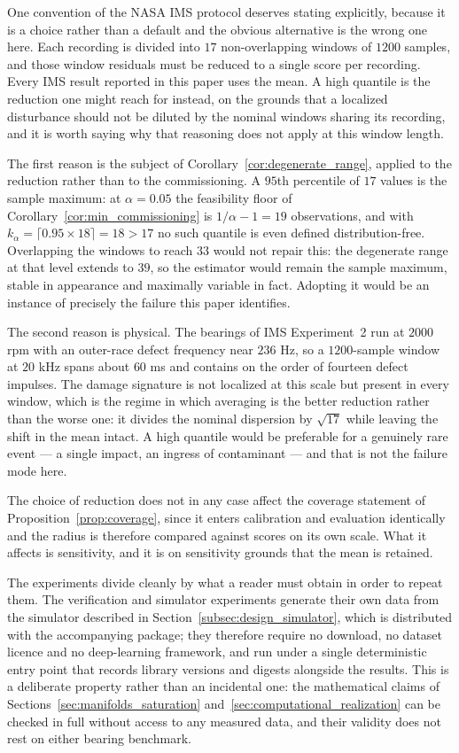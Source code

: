 \documentclass[a4paper]{cas-sc}
\begin{document}
One convention of the NASA IMS protocol deserves stating explicitly, because
it is a choice rather than a default and the obvious alternative is the wrong
one here. Each recording is divided into \(17\) non-overlapping windows of
\(1200\) samples, and those window residuals must be reduced to a single score
per recording. Every IMS result reported in this paper uses the mean. A high
quantile is the reduction one might reach for instead, on the grounds that a
localized disturbance should not be diluted by the nominal windows sharing its
recording, and it is worth saying why that reasoning does not apply at this
window length.

The first reason is the subject of
Corollary~\ref{cor:degenerate_range}, applied to the reduction rather than to
the commissioning. A \(95\)th percentile of \(17\) values is the sample
maximum: at \(\alpha=0.05\) the feasibility floor of
Corollary~\ref{cor:min_commissioning} is \(1/\alpha-1=19\) observations, and
with \(k_\alpha=\lceil 0.95\times 18\rceil = 18 > 17\) no such quantile is
even defined distribution-free. Overlapping the windows to reach \(33\) would
not repair this: the degenerate range at that level extends to \(39\), so the
estimator would remain the sample maximum, stable in appearance and maximally
variable in fact. Adopting it would be an instance of precisely the failure
this paper identifies.

The second reason is physical. The bearings of IMS Experiment~2 run at
\(2000\) rpm with an outer-race defect frequency near \(236\) Hz, so a
\(1200\)-sample window at \(20\) kHz spans about \(60\) ms and contains on the
order of fourteen defect impulses. The damage signature is not localized at
this scale but present in every window, which is the regime in which averaging
is the better reduction rather than the worse one: it divides the nominal
dispersion by \(\sqrt{17}\) while leaving the shift in the mean intact. A high
quantile would be preferable for a genuinely rare event --- a single impact, an
ingress of contaminant --- and that is not the failure mode here.

The choice of reduction does not in any case affect the coverage statement of
Proposition~\ref{prop:coverage}, since it enters calibration and evaluation
identically and the radius is therefore compared against scores on its own
scale. What it affects is sensitivity, and it is on sensitivity grounds that
the mean is retained.

The experiments divide cleanly by what a reader must obtain in order to repeat
them. The verification and simulator experiments generate their own data from
the simulator described in
Section~\ref{subsec:design_simulator}, which is distributed with the
accompanying package; they therefore require no download, no dataset licence
and no deep-learning framework, and run under a single deterministic entry
point that records library versions and digests alongside the results. This is
a deliberate property rather than an incidental one: the mathematical claims of
Sections~\ref{sec:manifolds_saturation}
and~\ref{sec:computational_realization} can be checked in full without access
to any measured data, and their validity does not rest on either bearing
benchmark.
\end{document}

